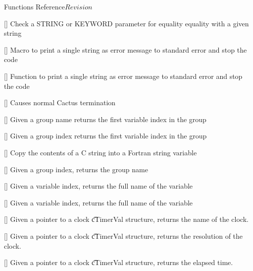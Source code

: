 \begin{cactuspart}{ Functions Reference}{}{$Revision$}
\begin{Lentry}
\item[\code{CCTK\_Equals}] [\pageref{CCTK-Equals}]
  Check a STRING or KEYWORD parameter for equality equality
  with a given string

\item[\code{CCTK\_ERROR}] [\pageref{CCTK-ERROR}]
  Macro to print a single string as error message to standard error
  and stop the code

\item[\code{CCTK\_Error}] [\pageref{CCTK-Error}]
  Function to print a single string as error message to standard error
  and stop the code

\item[\code{CCTK\_Exit}] [\pageref{CCTK-Exit}]
  Causes normal Cactus termination

\item[\code{CCTK\_FirstVarIndex}] [\pageref{CCTK-FirstVarIndex}]
  Given a group name returns the first variable index in the group

\item[\code{CCTK\_FirstVarIndexI}] [\pageref{CCTK-FirstVarIndexI}]
  Given a group index returns the first variable index in the group

\item[\code{CCTK\_FortranString}] [\pageref{CCTK-FortranString}]
  Copy the contents of a C string into a Fortran string variable

\item[\code{CCTK\_FullGroupName}] [\pageref{CCTK-FullGroupName}]
  Given a group index, returns the group name

\item[\code{CCTK\_FullName}] [\pageref{CCTK-FullName}]
  Given a variable index, returns the full name of the variable

\item[\code{CCTK\_FullVarName}] [\pageref{CCTK-FullVarName}]
  Given a variable index, returns the full name of the variable

\item[\code{CCTK\_GetClockName}] [\pageref{CCTK-GetClockName}]
  Given a pointer to a clock {\t cTimerVal} structure, returns the name
  of the clock.

\item[\code{CCTK\_GetClockResolution}] [\pageref{CCTK-GetClockResolution}]
  Given a pointer to a clock {\t cTimerVal} structure, returns the resolution
  of the clock.

\item[\code{CCTK\_GetClockSeconds}] [\pageref{CCTK-GetClockSeconds}]
  Given a pointer to a clock {\t cTimerVal} structure, returns the elapsed time.


\end{Lentry}
\end{cactuspart}
